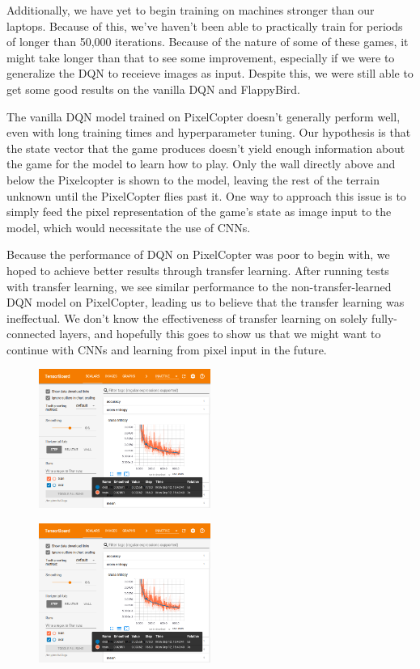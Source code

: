 \documentclass{article}
\begin{document}
Additionally, we have yet to begin training on machines stronger than our laptops.
Because of this, we've haven't been able to practically train for periods of longer than 50,000 iterations.
Because of the nature of some of these games, it might take longer than that to see some improvement, especially if we were to generalize the DQN to receieve images as input.
Despite this, we were still able to get some good results on the vanilla DQN and FlappyBird.

The vanilla DQN model trained on PixelCopter doesn't generally perform well, even with long training times and hyperparameter tuning.
Our hypothesis is that the state vector that the game produces doesn't yield enough information about the game for the model to learn how to play. 
Only the wall directly above and below the Pixelcopter is shown to the model, leaving the rest of the terrain unknown until the PixelCopter flies past it.
One way to approach this issue is to simply feed the pixel representation of the game's state as image input to the model, which would necessitate the use of CNNs.

Because the performance of DQN on PixelCopter was poor to begin with, we hoped to achieve better results through transfer learning.
After running tests with transfer learning, we see similar performance to the non-transfer-learned DQN model on PixelCopter, leading us to believe that the transfer learning was ineffectual.
We don't know the effectiveness of transfer learning on solely fully-connected layers, and hopefully this goes to show us that we might want to continue with CNNs and learning from pixel input in the future.

\begin{figure}[h!]
\includegraphics[width=0.5\textwidth]{test-tensorboard}
\label{fig:transfer-training}
\end{figure}

\begin{figure}[h!]
\includegraphics[width=0.5\textwidth]{test-tensorboard}
\label{fig:transfer-test}
\end{figure}



\end{document}
